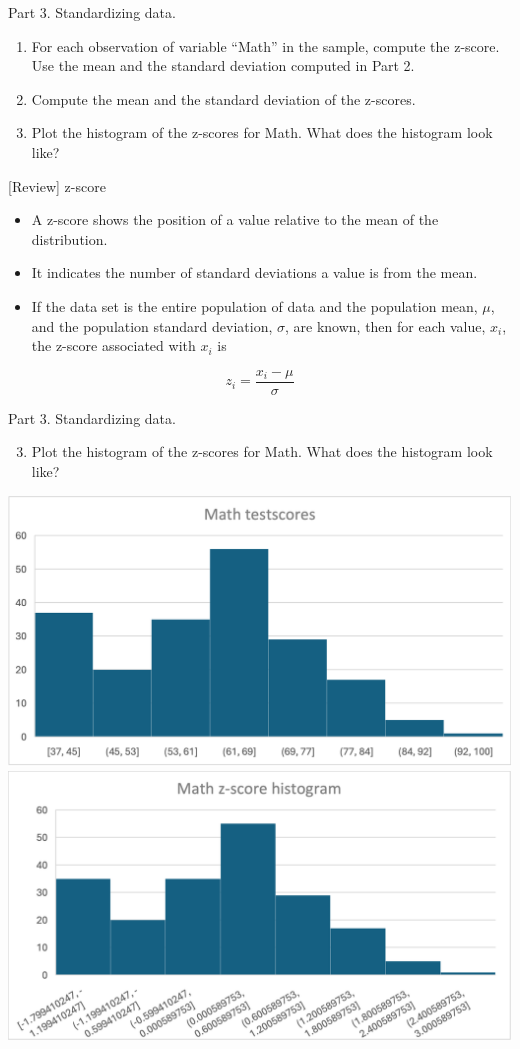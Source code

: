 \documentclass[
  10pt,
  ignorenonframetext,
]{beamer}
\providecommand{\tightlist}{%
  \setlength{\itemsep}{0pt}\setlength{\parskip}{0pt}}
\begin{document}
\begin{frame}{Part 3. Standardizing data.}
\protect\hypertarget{part-3.-standardizing-data.}{}
\begin{enumerate}
\tightlist
\item
  For each observation of variable ``Math'' in the sample, compute the
  z-score. Use the mean and the standard deviation computed in Part 2.
\item
  Compute the mean and the standard deviation of the z-scores.
\item
  Plot the histogram of the z-scores for Math. What does the histogram
  look like?
\end{enumerate}
\end{frame}

\begin{frame}{{[}Review{]} z-score}
\protect\hypertarget{review-z-score}{}
\begin{itemize}
\item
  A z-score shows the position of a value relative to the mean of the
  distribution.
\item
  It indicates the number of standard deviations a value is from the
  mean.
\item
  If the data set is the entire population of data and the population
  mean, \(\mu\), and the population standard deviation, \(\sigma\), are
  known, then for each value, \(x_i\), the z-score associated with
  \(x_i\) is
\end{itemize}

\[
z_i = \frac{x_i - \mu}{\sigma}
\]
\end{frame}

\begin{frame}{Part 3. Standardizing data.}
\protect\hypertarget{part-3.-standardizing-data.-1}{}
\begin{enumerate}
\setcounter{enumi}{2}
\tightlist
\item
  Plot the histogram of the z-scores for Math. What does the histogram
  look like?
\end{enumerate}

\begin{center}\includegraphics[width=0.45\linewidth,height=0.3\textheight]{pictures/Mathscores_hist} \includegraphics[width=0.45\linewidth,height=0.3\textheight]{pictures/zMathscores_hist} \end{center}
\end{frame}
\end{document}

